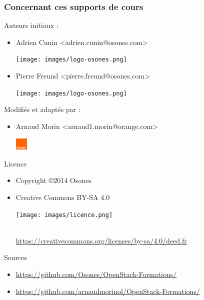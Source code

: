   \begin{frame}
    \frametitle{Concernant ces supports de cours}
    Auteurs initiaux :
    \begin{itemize}
      \item Adrien Cunin \textless adrien.cunin@osones.com\textgreater 
        \begin{minipage}[c]{1.5cm}
          \texttt{[image: images/logo-osones.png]}
        \end{minipage}
      \item Pierre Freund \textless pierre.freund@osones.com\textgreater
        \begin{minipage}[c]{1.5cm}
          \texttt{[image: images/logo-osones.png]}
        \end{minipage}
    \end{itemize}
    
    \vspace{0.3cm}
    Modifiés et adaptés par :
    \begin{itemize}
      \item Arnaud Morin \textless arnaud1.morin@orange.com\textgreater
        \begin{minipage}[c]{1.5cm}
          \includegraphics[height=0.6cm]{images/orange.jpg}
        \end{minipage}
    \end{itemize}
    
    \vspace{0.3cm}
    Licence
    \begin{itemize}
      \item Copyright \copyright{2014 Osones}
      \item Creative Commons BY-SA 4.0 
        \begin{minipage}[c]{3cm}
          \texttt{[image: images/licence.png]} 
        \end{minipage}\\
        \url{https://creativecommons.org/licenses/by-sa/4.0/deed.fr}
    \end{itemize}
    
    \vspace{0.3cm}
    Sources
    \begin{itemize}
      \item \url{https://github.com/Osones/OpenStack-Formations/}
      \item \url{https://github.com/arnaudmorinol/OpenStack-Formations/}
    \end{itemize}
  \end{frame}


